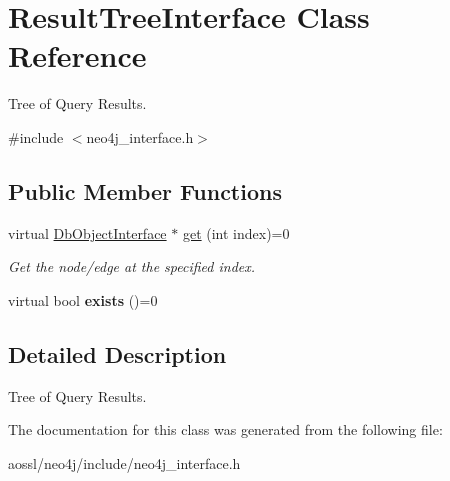 \hypertarget{classResultTreeInterface}{}\section{Result\+Tree\+Interface Class Reference}
\label{classResultTreeInterface}


Tree of Query Results.  




{\ttfamily \#include $<$neo4j\+\_\+interface.\+h$>$}

\subsection*{Public Member Functions}
\begin{DoxyCompactItemize}
\item 
virtual \hyperlink{classDbObjectInterface}{Db\+Object\+Interface} $\ast$ \hyperlink{classResultTreeInterface_acc4e0493661f5f2b0b836c7a1bdb3a8f}{get} (int index)=0\hypertarget{classResultTreeInterface_acc4e0493661f5f2b0b836c7a1bdb3a8f}{}\label{classResultTreeInterface_acc4e0493661f5f2b0b836c7a1bdb3a8f}

\begin{DoxyCompactList}\small\item\em Get the node/edge at the specified index. \end{DoxyCompactList}\item 
virtual bool {\bfseries exists} ()=0\hypertarget{classResultTreeInterface_adcaf15021fcf43cb2ee457f99c04fc5d}{}\label{classResultTreeInterface_adcaf15021fcf43cb2ee457f99c04fc5d}

\end{DoxyCompactItemize}


\subsection{Detailed Description}
Tree of Query Results. 

The documentation for this class was generated from the following file\+:\begin{DoxyCompactItemize}
\item 
aossl/neo4j/include/neo4j\+\_\+interface.\+h\end{DoxyCompactItemize}
